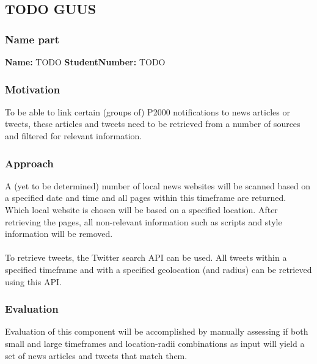 
\subsection{TODO GUUS}
\subsubsection*{Name part}
\textbf{Name:} TODO \indent \textbf{StudentNumber:} TODO

\subsubsection*{Motivation}
To be able to link certain (groups of) P2000 notifications to news articles or tweets, these articles and tweets need to be retrieved from a number of sources and filtered for relevant information.

\subsubsection*{Approach}
A (yet to be determined) number of local news websites will be scanned based on a specified date and time and all pages within this timeframe are returned. Which local website is chosen will be based on a specified location. After retrieving the pages, all non-relevant information such as scripts and style information will be removed.\\\\
To retrieve tweets, the Twitter search API can be used. All tweets within a specified timeframe and with a specified geolocation (and radius) can be retrieved using this API.

\subsubsection*{Evaluation }
Evaluation of this component will be accomplished by manually assessing if both small and large timeframes and location-radii combinations as input will yield a set of news articles and tweets that match them.